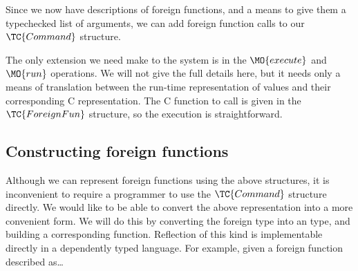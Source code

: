 
Since we now have descriptions of foreign functions, and a means to
give them a typechecked list of arguments, we can add foreign function
calls to our $\TC{Command}$ structure.


The only extension we need make to the system is in the $\MO{execute}$
and $\MO{run}$ operations. We will not give the full details here, but
it needs only a means of translation between the run-time
representation of \Idris{} values and their corresponding C
representation. The C function to call is given in the
$\TC{ForeignFun}$ structure, so the execution is straightforward.

\subsection{Constructing foreign functions}

Although we can represent foreign functions using the above
structures, it is inconvenient to require a programmer to use the
$\TC{Command}$ structure directly. We would like to be able to convert
the above representation into a more convenient form. We will do this
by converting the foreign type into an \Idris{} type, and building a
corresponding function. Reflection of this kind is implementable
directly in a dependently typed language. For example, given a foreign
function described as\ldots


